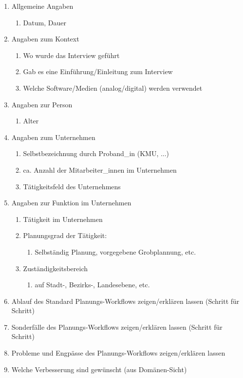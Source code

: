 \documentclass[Bachelorarbeit.tex]{subfiles}
\begin{document}
\begin{enumerate}
	\item Allgemeine Angaben
	\begin{enumerate}
		\item Datum, Dauer
	\end{enumerate}
	\item Angaben zum Kontext
	\begin{enumerate}
		\item Wo wurde das Interview geführt
		\item Gab es eine Einführung/Einleitung zum Interview
		\item Welche Software/Medien (analog/digital) werden verwendet
	\end{enumerate}
	\item Angaben zur Person
	\begin{enumerate}
		\item Alter
	\end{enumerate}
	\item Angaben zum Unternehmen
	\begin{enumerate}
		\item Selbstbezeichnung durch Proband\_in  (KMU, ...)
		\item ca. Anzahl der Mitarbeiter\_innen im Unternehmen
		\item Tätigkeitsfeld des Unternehmens
	\end{enumerate}
	\item Angaben zur Funktion im Unternehmen
	\begin{enumerate}
		\item Tätigkeit im Unternehmen
		\item Planungsgrad der Tätigkeit:
		\begin{enumerate}
			\item Selbständig Planung, vorgegebene Grobplannung, etc.
		\end{enumerate}
		\item Zuständigkeitsbereich
		\begin{enumerate}
			\item auf Stadt-, Bezirks-, Landesebene, etc.
		\end{enumerate}
	\end{enumerate}
	\item Ablauf des Standard Planungs-Workflows zeigen/erklären lassen (Schritt für Schritt)
	\item Sonderfälle des Planungs-Workflows zeigen/erklären lassen (Schritt für Schritt)
	\item Probleme und Engpässe des Planungs-Workflows zeigen/erklären lassen
	\item Welche Verbesserung sind gewünscht (aus Domänen-Sicht)
\end{enumerate}
\newpage
\end{document}

